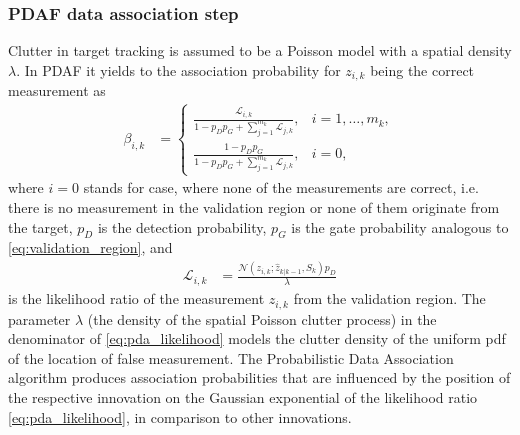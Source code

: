 \subsubsection{PDAF data association step}
Clutter in target tracking is assumed to be a Poisson model with a spatial density $\lambda$. In PDAF it yields to the association probability for $z_{i,k}$ being the correct measurement as
\begin{align}
    \beta_{i,k} &=
    \begin{cases}
        {\frac{\displaystyle\mathcal{L}_{i,k}}{\displaystyle 1-p_D p_G + \sum_{j=1}^{m_k}\mathcal{L}_{j,k}}}, & i=1, \dots, m_k, \\
        {\frac{\displaystyle 1-p_D p_G}{\displaystyle 1-p_D p_G + \sum_{j=1}^{m_k}\mathcal{L}_{j,k}}}, & i =0,
    \end{cases}
    \label{eq:pda_beta}
\end{align}
where $i=0$ stands for case, where none of the measurements are correct, i.e. there is no measurement in the
validation region or none of them originate from the target, $p_D$ is the detection probability, $p_G$ is
the gate
probability
analogous to \eqref{eq:validation_region}, and
\begin{align}
    \mathcal{L}_{i,k} &= \frac{\mathcal{N}(z_{i,k};\hat{z}_{k|k-1}, S_k) p_D}{\lambda} \label{eq:pda_likelihood}
\end{align}
is the likelihood ratio of the measurement $z_{i,k}$ from the validation region. The parameter $\lambda$ (the density
of the spatial Poisson clutter process) in the denominator of \eqref{eq:pda_likelihood} models the clutter density of
the uniform pdf of the location of false measurement. The Probabilistic Data Association algorithm produces association probabilities that are influenced by the position of the respective innovation on the Gaussian exponential of the likelihood ratio \eqref{eq:pda_likelihood}, in comparison to other innovations.

